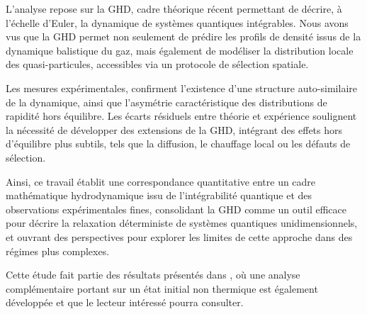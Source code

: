 \medskip

L’analyse repose sur la \gls*{GHD}, cadre théorique récent permettant de décrire, à l’échelle d’Euler, la dynamique de systèmes quantiques intégrables. Nous avons vus que la \gls*{GHD} permet non seulement de prédire les profils de densité issus de la dynamique balistique du gaz, mais également de modéliser la distribution locale des quasi-particules, accessibles via un protocole de sélection spatiale.

\medskip

Les mesures expérimentales,  confirment l’existence d’une structure auto-similaire de la dynamique, ainsi que l’asymétrie caractéristique des distributions de rapidité hors équilibre. Les écarts résiduels entre théorie et expérience soulignent la nécessité de développer des extensions de la GHD, intégrant des effets hors d’équilibre plus subtils, tels que la diffusion, le chauffage local ou les défauts de sélection.

\medskip

Ainsi, ce travail établit une correspondance quantitative entre un cadre mathématique hydrodynamique issu de l’intégrabilité quantique et des observations expérimentales fines, consolidant la \gls*{GHD} comme un outil efficace pour décrire la relaxation déterministe de systèmes quantiques unidimensionnels, et ouvrant des perspectives pour explorer les limites de cette approche dans des régimes plus complexes.

\medskip

Cette étude fait partie des résultats présentés dans \cite{Dubois2025}, où une analyse complémentaire portant sur un état initial non thermique est également développée et que le lecteur intéressé pourra consulter.

